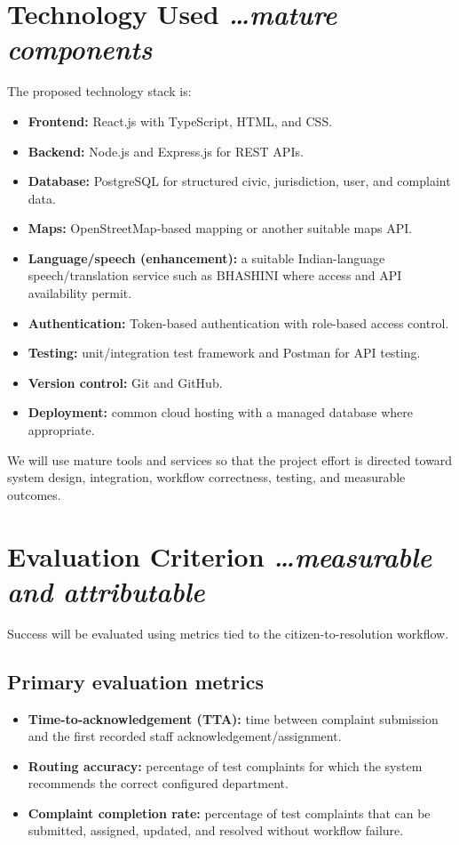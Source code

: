 \documentclass[11pt,a4paper]{article}
\newcommand{\BvrHint}[1]{{\normalfont\normalsize\itshape\hfill #1}}
\begin{document}
\section{Technology Used %
\BvrHint{\ldots mature components}}
The proposed technology stack is:
\begin{itemize}[leftmargin=0.7cm]
    \item \textbf{Frontend:} React.js with TypeScript, HTML, and CSS.
    \item \textbf{Backend:} Node.js and Express.js for REST APIs.
    \item \textbf{Database:} PostgreSQL for structured civic, jurisdiction, user, and complaint data.
    \item \textbf{Maps:} OpenStreetMap-based mapping or another suitable maps API.
    \item \textbf{Language/speech (enhancement):} a suitable Indian-language speech/translation service such as BHASHINI where access and API availability permit.
    \item \textbf{Authentication:} Token-based authentication with role-based access control.
    \item \textbf{Testing:} unit/integration test framework and Postman for API testing.
    \item \textbf{Version control:} Git and GitHub.
    \item \textbf{Deployment:} common cloud hosting with a managed database where appropriate.
\end{itemize}

We will use mature tools and services so that the project effort is directed toward system design, integration, workflow correctness, testing, and measurable outcomes.

\section{Evaluation Criterion %
\BvrHint{\ldots measurable and attributable}}
Success will be evaluated using metrics tied to the citizen-to-resolution workflow.

\subsection{Primary evaluation metrics}
\begin{itemize}[leftmargin=0.7cm]
    \item \textbf{Time-to-acknowledgement (TTA):} time between complaint submission and the first recorded staff acknowledgement/assignment.
    \item \textbf{Routing accuracy:} percentage of test complaints for which the system recommends the correct configured department.
    \item \textbf{Complaint completion rate:} percentage of test complaints that can be submitted, assigned, updated, and resolved without workflow failure.
\end{itemize}
\end{document}
